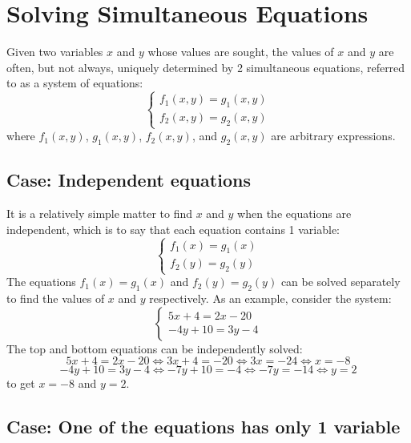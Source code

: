 \documentclass{article}
\begin{document}
\section*{Solving Simultaneous Equations}

Given two variables \(x\) and \(y\) whose values are sought, the values of \(x\) and \(y\) are often, but not always, uniquely determined by 2 simultaneous equations, referred to as a system of equations:
\[\left\{\begin{array}{c} f_1(x,y) = g_1(x,y) \\ f_2(x,y) = g_2(x,y) \end{array}\right.\]
where \(f_1(x,y)\), \(g_1(x,y)\), \(f_2(x,y)\), and \(g_2(x,y)\) are arbitrary expressions.



\subsection*{Case: Independent equations}

It is a relatively simple matter to find \(x\) and \(y\) when the equations are independent, which is to say that each equation contains 1 variable:
\[\left\{\begin{array}{c} f_1(x) = g_1(x) \\ f_2(y) = g_2(y) \end{array}\right.\]
The equations \(f_1(x) = g_1(x)\) and \(f_2(y) = g_2(y)\) can be solved separately to find the values of \(x\) and \(y\) respectively. As an example, consider the system:
\[\left\{\begin{array}{c}
5x + 4 = 2x - 20 \\
-4y + 10 = 3y - 4
\end{array}\right.\]
The top and bottom equations can be independently solved:
\[5x + 4 = 2x - 20 \iff 3x + 4 = -20 \iff 3x = -24 \iff x = -8\]
\[-4y + 10 = 3y - 4 \iff -7y + 10 = -4 \iff -7y = -14 \iff y = 2\]
to get \(x = -8\) and \(y = 2\).



\subsection*{Case: One of the equations has only 1 variable}
\end{document}
